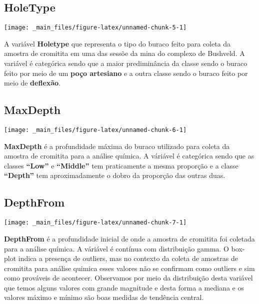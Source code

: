 \documentclass[
]{article}
\begin{document}
\hypertarget{holetype}{%
\subsection{HoleType}\label{holetype}}

\begin{center}\texttt{[image: \_main\_files/figure-latex/unnamed-chunk-5-1]} \end{center}

A variável \textbf{Holetype} que representa o tipo do buraco feito para coleta da amostra de cromitita em uma das sessõe da mina do complexo de Bushveld. A variável é categórica sendo que a maior prediminância da classe sendo o buraco feito por meio de um \textbf{poço artesiano} e a outra classe sendo o buraco feito por meio de \textbf{deflexão}.

\hypertarget{maxdepth}{%
\subsection{MaxDepth}\label{maxdepth}}

\begin{center}\texttt{[image: \_main\_files/figure-latex/unnamed-chunk-6-1]} \end{center}

\textbf{MaxDepth} é a profundidade máxima do buraco utilizado para coleta da amostra de cromitita para a análise química. A váriável é categórica sendo que as classes \textbf{``Low''} e \textbf{``Middle''} tem praticamente a mesma proporção e a classe \textbf{``Depth''} tem aproximadamente o dobro da proporção das outras duas.

\hypertarget{depthfrom}{%
\subsection{DepthFrom}\label{depthfrom}}

\begin{center}\texttt{[image: \_main\_files/figure-latex/unnamed-chunk-7-1]} \end{center}

\textbf{DepthFrom} é a profundidade inicial de onde a amostra de cromitita foi coletada para a análise química. A váriável é contínua com distribuição gamma. O box-plot indica a presença de outliers, mas no contexto da coleta de amostras de cromitita para análise quimica esses valores não se confirmam como outliers e sim como prováveis de acontecer. Observamos por meio da distribuição desta variável que temos alguns valores com grande magnitude e desta forma a mediana e os valores máximo e mínimo são boas medidas de tendência central.
\end{document}
